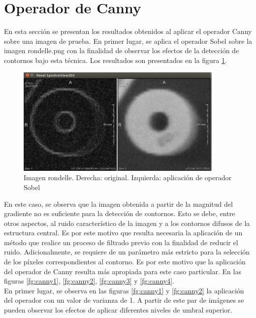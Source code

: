 \documentclass{article}
\begin{document}
\FloatBarrier
\section{Operador de Canny}

En esta sección se presentan los resultados obtenidos al aplicar el operador Canny sobre una imagen de prueba. En primer lugar, se aplica el operador Sobel sobre la imagen rondelle.png con la finalidad de observar los efectos de la detección de contornos bajo esta técnica. Los resultados son presentados en la figura \ref{fg:sobelOrig}.

\begin{figure}[ht]
\begin{center}
\includegraphics[width=0.9\textwidth]{2canny/2_sobel_orig} %
\caption{Imagen rondelle. Derecha: original. Izquierda: aplicación de operador Sobel}
\label{fg:sobelOrig}
\end{center}
\end{figure}
\FloatBarrier

En este caso, se observa que la imagen obtenida a partir de la magnitud del gradiente no es suficiente para la detección de contornos. Esto se debe, entre otros aspectos, al ruido característico de la imagen y a los contornos difusos de la estructura central. Es por este motivo que resulta necesaria la aplicación de un método que realice un proceso de filtrado previo con la finalidad de reducir el ruido. Adicionalmente, se requiere de un parámetro más estricto para la selección de los píxeles correspondientes al contorno. Es por este motivo que la aplicación del operador de Canny resulta más apropiada para este caso particular. En las figuras \ref{fg:canny1}, \ref{fg:canny2}, \ref{fg:canny3} y \ref{fg:canny4}. \\
En primer lugar, se observa en las figuras \ref{fg:canny1} y \ref{fg:canny2} la aplicación del operador con un valor de varianza de 1. A partir de este par de imágenes se pueden observar los efectos de aplicar diferentes niveles de umbral superior.
\end{document}
